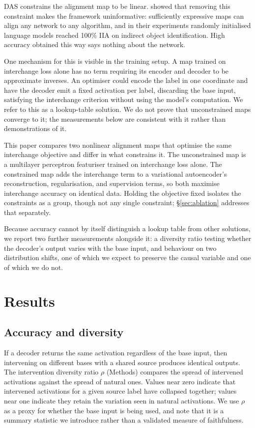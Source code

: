 \documentclass[11pt]{article}
\begin{document}
DAS constrains the alignment map to be linear. \citet{sutter2025nonlinear} showed
that removing this constraint makes the framework uninformative: sufficiently
expressive maps can align any network to any algorithm, and in their experiments
randomly initialised language models reached 100\% IIA on indirect object
identification. High accuracy obtained this way says nothing about the network.

One mechanism for this is visible in the training setup. A map trained on
interchange loss alone has no term requiring its encoder and decoder to be
approximate inverses. An optimiser could encode the label in one coordinate and
have the decoder emit a fixed activation per label, discarding the base input,
satisfying the interchange criterion without using the model's computation. We
refer to this as a lookup-table solution. We do not prove that unconstrained maps
converge to it; the measurements below are consistent with it rather than
demonstrations of it.

This paper compares two nonlinear alignment maps that optimise the same
interchange objective and differ in what constrains it. The unconstrained map is
a multilayer perceptron featuriser trained on interchange loss alone. The
constrained map adds the interchange term to a variational autoencoder's
reconstruction, regularisation, and supervision terms, so both maximise
interchange accuracy on identical data. Holding the objective fixed isolates the
constraints as a group, though not any single constraint; \S\ref{sec:ablation}
addresses that separately.

Because accuracy cannot by itself distinguish a lookup table from other
solutions, we report two further measurements alongside it: a diversity ratio
testing whether the decoder's output varies with the base input, and behaviour on
two distribution shifts, one of which we expect to preserve the causal variable
and one of which we do not.

\section{Results}
\label{sec:results}

\subsection{Accuracy and diversity}
\label{sec:vacuity}

If a decoder returns the same activation regardless of the base input, then
intervening on different bases with a shared source produces identical outputs.
The intervention diversity ratio $\rho$ (Methods) compares the spread of
intervened activations against the spread of natural ones. Values near zero
indicate that intervened activations for a given source label have collapsed
together; values near one indicate they retain the variation seen in natural
activations. We use $\rho$ as a proxy for whether the base input is being used,
and note that it is a summary statistic we introduce rather than a validated
measure of faithfulness.
\end{document}
